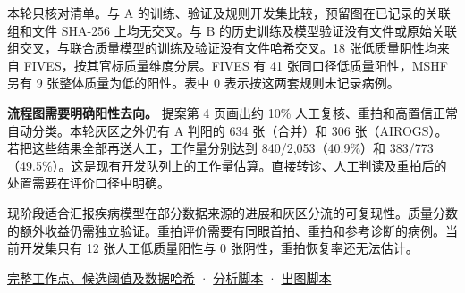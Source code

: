 \documentclass[
  10pt,
]{article}
\begin{document}
本轮只核对清单。与 A
的训练、验证及规则开发集比较，预留图在已记录的关联组和文件 SHA-256
上均无交叉。与 B
的历史训练及模型验证没有文件或原始关联组交叉，与联合质量模型的训练及验证没有文件哈希交叉。18
张低质量阴性均来自 FIVES，按其官标质量维度分层。FIVES 有 41
张同口径低质量阳性，MSHF 另有 9 张整体质量为低的阳性。表中 0
表示按这两套规则未记录病例。

\textbf{流程图需要明确阳性去向。} 提案第 4 页画出约 10\%
人工复核、重拍和高置信正常自动分类。本轮灰区之外仍有 A 判阳的 634
张（合并）和 306 张（AIROGS）。若把这些结果全部再送人工，工作量分别达到
840/2,053（40.9\%）和
383/773（49.5\%）。这是现有开发队列上的工作量估算。直接转诊、人工判读及重拍后的处置需要在评价口径中明确。

现阶段适合汇报疾病模型在部分数据来源的进展和灰区分流的可复现性。质量分数的额外收益仍需独立验证。重拍评价需要有同眼首拍、重拍和参考诊断的病例。当前开发集只有
12 张人工低质量阳性与 0 张阴性，重拍恢复率还无法估计。

\href{gray-zone-results.json}{完整工作点、候选阈值及数据哈希} ·
\href{../../../tools/audit_gray_zone_20261118.py}{分析脚本} ·
\href{../../../tools/plot_gray_zone_20261118.py}{出图脚本}
\end{document}
